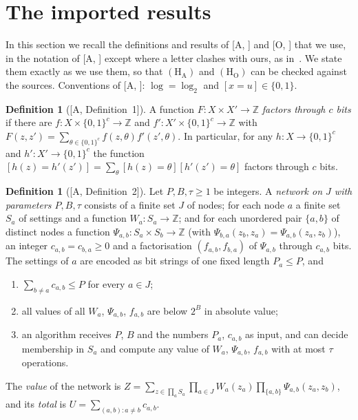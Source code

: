 \documentclass[10pt]{amsart}
\theoremstyle{plain}
\theoremstyle{definition}
\newtheorem{definition}[theorem]{Definition}
\theoremstyle{remark}
\numberwithin{equation}{section}
\newcommand{\Z}{\mathbb{Z}}
\newcommand{\A}[1][]{\textup{[A\if\relax\detokenize{#1}\relax\else, #1\fi]}}
\newcommand{\Oa}[1][]{\textup{[O\if\relax\detokenize{#1}\relax\else, #1\fi]}}
\begin{document}
\section{The imported results}\label{sec:imported}

In this section we recall the definitions and results of \A{} and \Oa{} that we use, in the
notation of \A{} except where a letter clashes with ours, as in~\cite{Tulsyan26}. We state them
exactly as we use them, so that $(\mathrm{H}_{\mathrm{A}})$ and $(\mathrm{H}_{\mathrm{O}})$ can be
checked against the sources. Conventions of \A: $\log=\log_2$ and
$[x=u]\in\{0,1\}$.

\begin{definition}[{\A[Definition~1]}]\label{def:factor}
A function $F\colon X\times X'\to\Z$ \emph{factors through $c$ bits} if there are
$f\colon X\times\{0,1\}^c\to\Z$ and $f'\colon X'\times\{0,1\}^c\to\Z$ with
$F(z,z')=\sum_{\theta\in\{0,1\}^c} f(z,\theta)f'(z',\theta)$. In particular, for any
$h\colon X\to\{0,1\}^c$ and $h'\colon X'\to\{0,1\}^c$ the function
$[h(z)=h'(z')]=\sum_\theta [h(z)=\theta][h'(z')=\theta]$ factors through $c$ bits.
\end{definition}

\begin{definition}[{\A[Definition~2]}]\label{def:network}
Let $P,B,\tau\ge1$ be integers. A \emph{network on $J$ with parameters $P,B,\tau$} consists of a
finite set $J$ of nodes; for each node $a$ a finite set $S_a$ of settings and a function
$W_a\colon S_a\to\Z$; and for each unordered pair $\{a,b\}$ of distinct nodes a function
$\Psi_{a,b}\colon S_a\times S_b\to\Z$ (with $\Psi_{b,a}(z_b,z_a)=\Psi_{a,b}(z_a,z_b)$), an integer
$c_{a,b}=c_{b,a}\ge0$ and a factorisation $(f_{a,b},f_{b,a})$ of $\Psi_{a,b}$ through $c_{a,b}$
bits. The settings of $a$ are encoded as bit strings of one fixed length $P_a\le P$, and
\begin{enumerate}[label=\textup{(\roman*)}]
\item $\sum_{b\ne a} c_{a,b}\le P$ for every $a\in J$;
\item all values of all $W_a$, $\Psi_{a,b}$, $f_{a,b}$ are below $2^B$ in absolute value;
\item an algorithm receives $P$, $B$ and the numbers $P_a$, $c_{a,b}$ as input, and can decide
membership in $S_a$ and compute any value of $W_a$, $\Psi_{a,b}$, $f_{a,b}$ with at most $\tau$
operations.
\end{enumerate}
The \emph{value} of the network is
$Z=\sum_{z\in\prod_a S_a}\prod_{a\in J}W_a(z_a)\prod_{\{a,b\}}\Psi_{a,b}(z_a,z_b)$, and its
\emph{total} is $U=\sum_{(a,b)\colon a\ne b}c_{a,b}$.
\end{definition}
\end{document}
